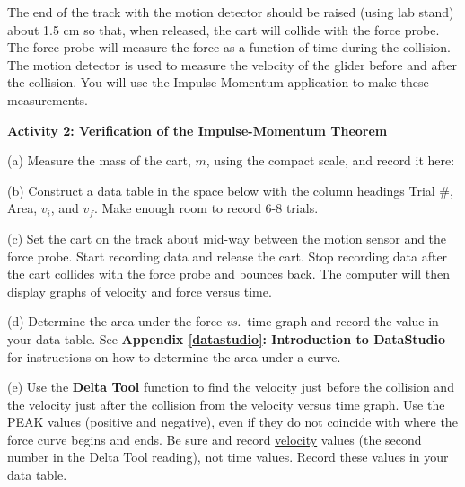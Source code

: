 The end of the track with the motion detector should be raised (using lab stand) 
about 1.5 cm so that, when released, the cart will collide with the force probe. 
The force probe will measure the force as a function of time during the collision. 
The motion detector is used to measure the velocity of the glider before and after the 
collision. You will use the Impulse-Momentum application to make these measurements.

\vspace{0.3cm}
{\par\centering {} \par}
\vspace{0.3cm}

\textbf{Activity 2: Verification of the Impulse-Momentum Theorem} 

(a) Measure the mass of the cart, $m$, using the compact scale, and record it here:
\vspace{10mm}

(b) Construct a data table in the space below with the column headings Trial
\#, Area, \( v_{i} \), and \( v_{f} \). Make enough room to record 6-8 trials.

\newpage


(c) Set the cart on the track about mid-way between the motion sensor and the force probe. Start recording data and release the cart. Stop recording data after the cart collides with the force probe and bounces back. The computer will then display graphs of velocity and force versus time.

(d) Determine the area under the force \textit{vs.}~time graph and record the value in
your data table. See \textbf{Appendix \ref{datastudio}: Introduction to DataStudio} for instructions on how to determine the area under a curve.

(e) Use the \textbf{Delta Tool} function to find the velocity just before the collision and the
velocity just after the collision from the velocity versus time graph. Use the 
PEAK values (positive and negative), even if they do not coincide with where 
the force curve begins and ends. Be sure and record \underline{velocity} values 
(the second number in the Delta Tool reading), not time values. 
Record these values in your data table.

